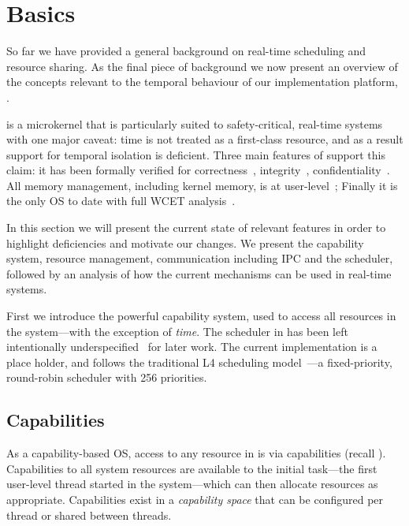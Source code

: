 

\chapter{\selfour Basics}
\label{chap:sel4}

So far we have provided a general background on real-time scheduling and resource sharing.
As the final piece of background we now present an overview of the concepts relevant to the temporal behaviour of our implementation platform, \selfour.

\selfour is a microkernel that is particularly suited to safety-critical, real-time systems
with one major caveat: time is not treated as a first-class resource, and as a result support for
temporal isolation is deficient. Three main features of \selfour
support this claim: it has been formally verified for correctness~\citep{Klein_EHACDEEKNSTW_09,
Klein_AEMSKH_14}, integrity~\citep{Sewell_WGMAK_11}, confidentiality~\citep{Murray_MBGBSLGK_13}.
All memory management, including kernel memory, is at
user-level~\citep{Elkaduwe_Derrin_06}; Finally it is the only \gls{OS} to date with full \gls{WCET}
analysis~\citep{Sewell_KH_16}.  

In this section we will present the current state of relevant \selfour features in order to
highlight deficiencies and motivate our changes.  We present the capability system, resource
management, communication including \gls{IPC} and the scheduler, followed by an analysis of
how the current mechanisms can be used in real-time systems.

First we introduce the powerful \selfour capability system, used to access all resources in the
system---with the exception of \emph{time}. The scheduler in \selfour has been left intentionally
underspecified~\citep{Petters_EH_12} for later work.  The current implementation is a place holder,
and follows the traditional L4 scheduling model~\citep{Ruocco_06}---a fixed-priority, round-robin
scheduler with 256 priorities. 


\section{Capabilities}
\label{s:capabilities}

As a capability-based \gls{OS}, access to any resource in \selfour is via capabilities (recall
). Capabilities to all system resources are available to the initial task---the first
user-level thread started in the system---which can then allocate resources as appropriate.
Capabilities exist in a \emph{capability space} that can be configured per thread or shared between
threads. 

